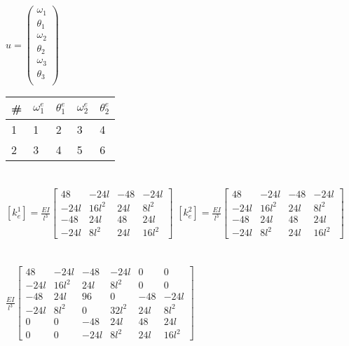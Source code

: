 \documentclass{article}
\title{}
\begin{document}
\section{}

${u} = \begin{pmatrix}
\omega_{1} \\
\theta_{1} \\
\omega_{2} \\
\theta_{2} \\
\omega_{3} \\
\theta_{3} \\
\end{pmatrix}$ \quad \quad
\begin{tabular}{|l|l|l|l|l|}
\hline
\# & $\omega_{1}^e$ & $\theta_{1}^e$ & $\omega_{2}^e$ & $\theta_{2}^e$ \\ \hline
1 & 1  & 2 & 3 & 4  \\ \hline
2 & 3 & 4 & 5 & 6 \\ \hline
\end{tabular}
\section{}
\([k_{e}^1] =
\frac{EI}{l^{3}}
\left[\begin{matrix}48 & - 24 l & -48 & - 24 l\\- 24 l & 16 l^{2} & 24 l & 8 l^{2}\\-48 & 24 l & 48 & 24 l\\- 24 l & 8 l^{2} & 24 l & 16 l^{2}\end{matrix}\right]
\) \quad
\([k_{e}^2] =
\frac{EI}{l^{3}}
\left[\begin{matrix}48 & - 24 l & -48 & - 24 l\\- 24 l & 16 l^{2} & 24 l & 8 l^{2}\\-48 & 24 l & 48 & 24 l\\- 24 l & 8 l^{2} & 24 l & 16 l^{2}\end{matrix}\right]
\)
\section{}
$
\frac{EI}{l^{3}}\left[\begin{matrix}48 & - 24 l & -48 & - 24 l & 0 & 0\\- 24 l & 16 l^{2} & 24 l & 8 l^{2} & 0 & 0\\-48 & 24 l & 96 & 0 & -48 & - 24 l\\- 24 l & 8 l^{2} & 0 & 32 l^{2} & 24 l & 8 l^{2}\\0 & 0 & -48 & 24 l & 48 & 24 l\\0 & 0 & - 24 l & 8 l^{2} & 24 l & 16 l^{2}\end{matrix}\right]
$
\end{document}
